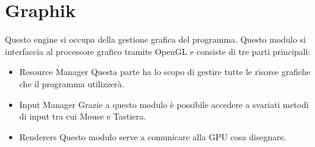 \documentclass{article}
\begin{document}
\section {Graphik}
Questo engine si occupa della gestione grafica del programma. Questo modulo si interfaccia al processore grafico tramite OpenGL e consiste di tre parti principali:


\begin{itemize}
	\item Resource Manager  Questa parte ha lo scopo di gestire tutte le risorse grafiche che il programma utilizzerà.
	\item Input Manager Grazie a questo modulo è possibile accedere a svariati metodi di input tra cui Mouse e Tastiera.
	\item Renderers Questo modulo serve a comunicare alla GPU cosa disegnare.
\end{itemize}
\end{document}
